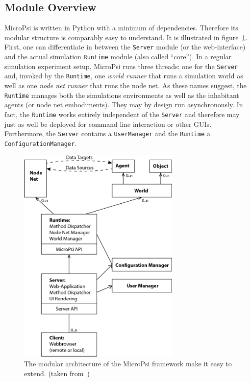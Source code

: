         \subsection{Module Overview}
MicroPsi is written in Python with a minimum of dependencies. Therefore its  modular structure is comparably easy to understand. It is illustrated in figure~\ref{micropsi2_modules}. First, one can differentiate in between the \texttt{Server} module (or the web-interface) and the actual simulation \texttt{Runtime} module (also called ``core''). In a regular simulation experiment setup, MicroPsi runs three threads: one for the \texttt{Server} and, invoked by the \texttt{Runtime}, one \emph{world runner} that runs a simulation world as well as one \emph{node net runner} that runs the node net. As these names suggest, the \texttt{Runtime} manages both the simulations environments as well as the inhabitant agents (or node net embodiments). They may by design run asynchronously. In fact, the \texttt{Runtime} works entirely independent of the \texttt{Server} and therefore may just as well be deployed for command line interaction or other GUIs. Furthermore, the \texttt{Server} contains a \texttt{UserManager} and the \texttt{Runtime} a \texttt{ConfigurationManager}.~\cite{conf/agi/Bach12}
\\          
          
\begin{figure}[h]
  \centering
    \includegraphics[width=8cm]{graphics/micropsi2_uml}
  \caption{The modular architecture of the MicroPsi framework make it easy to extend. (taken from~\cite{conf/agi/Bach12})}
  \label{micropsi2_modules}
\end{figure}

